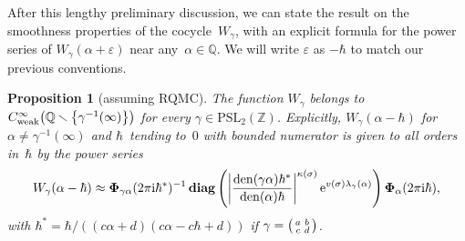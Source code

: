 \documentclass[pdftex]{sigma}
\numberwithin{equation}{section}
\newtheorem{Proposition}[Theorem]{Proposition}
\def\l{\lambda}
\def\k{\kappa}
\def\PSL{\mathrm{PSL}}
\def\a{\alpha}
\def\l{\lambda}
\def\Z{\mathbb Z}
\def\Q{\mathbb Q}
\def\i{^{-1}}
\def\a{\alpha}
\def\l{\lambda}
\def\s{\sigma}
\def\v{\varepsilon}
\def\sma#1#2#3#4{\bigl(\smallmatrix#1&#2\\#3&#4\endsmallmatrix\bigr)} %
\def\den{\mathrm{den}}
\def\be{\begin{equation}}
\def\ee{\end{equation}}
\def\ssm{\smallsetminus}
\def\g{\gamma}
\def\diag{\operatorname{\mathbf{diag}}} %
\def\bPhi{\mathbf\Phi}
\begin{document}
After this lengthy preliminary discussion, we can state the result on the smoothness
properties of the cocycle~$W_\g$, with an explicit formula for the power series of
$W_\g(\a+\v)$ near any~$\a\in\Q$. We will write $\v$ as $-\hbar$ to match our previous
conventions.

\begin{Proposition}[assuming RQMC]\label{prop.W1}
The function $W_\g$ belongs to $C^\infty_{\text{\rm weak}}\big(\Q\ssm\big\{\g\i(\infty)\big\}\big)$ for
every $\g\in\PSL_2(\Z)$. Explicitly, $W_\g(\a-\hbar)$ for $\a\ne\g\i(\infty)$ and
$\hbar$~tending to~$0$
with bounded numerator is given to all orders in~$\hbar$ by the power series
\be\label{WTaylor}
W_\g(\a-\hbar) \approx \bPhi_{\g\a}(2\pi {\rm i}\hbar^*)\i
 \diag\left( \left|\frac{\den(\g\a) \hbar^*}{\den(\a) \hbar}\right|^{\k(\s)}
 {\rm e}^{v(\s)\l_\g(\a)}\right) \bPhi_\a(2\pi {\rm i}\hbar) ,
\ee
with $\hbar^*=\hbar/((c\a+d)(c\a-c\hbar+d))$ if $\g=\sma abcd$.
\end{Proposition}
\end{document}
